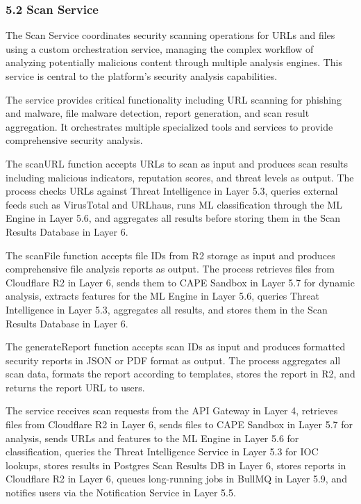 \documentclass[12pt,a4paper]{report}
\begin{document}
\subsubsection{5.2 Scan Service}

The Scan Service coordinates security scanning operations for URLs and files using a custom orchestration service, managing the complex workflow of analyzing potentially malicious content through multiple analysis engines. This service is central to the platform's security analysis capabilities.

The service provides critical functionality including URL scanning for phishing and malware, file malware detection, report generation, and scan result aggregation. It orchestrates multiple specialized tools and services to provide comprehensive security analysis.

The scanURL function accepts URLs to scan as input and produces scan results including malicious indicators, reputation scores, and threat levels as output. The process checks URLs against Threat Intelligence in Layer 5.3, queries external feeds such as VirusTotal and URLhaus, runs ML classification through the ML Engine in Layer 5.6, and aggregates all results before storing them in the Scan Results Database in Layer 6.

The scanFile function accepts file IDs from R2 storage as input and produces comprehensive file analysis reports as output. The process retrieves files from Cloudflare R2 in Layer 6, sends them to CAPE Sandbox in Layer 5.7 for dynamic analysis, extracts features for the ML Engine in Layer 5.6, queries Threat Intelligence in Layer 5.3, aggregates all results, and stores them in the Scan Results Database in Layer 6.

The generateReport function accepts scan IDs as input and produces formatted security reports in JSON or PDF format as output. The process aggregates all scan data, formats the report according to templates, stores the report in R2, and returns the report URL to users.

The service receives scan requests from the API Gateway in Layer 4, retrieves files from Cloudflare R2 in Layer 6, sends files to CAPE Sandbox in Layer 5.7 for analysis, sends URLs and features to the ML Engine in Layer 5.6 for classification, queries the Threat Intelligence Service in Layer 5.3 for IOC lookups, stores results in Postgres Scan Results DB in Layer 6, stores reports in Cloudflare R2 in Layer 6, queues long-running jobs in BullMQ in Layer 5.9, and notifies users via the Notification Service in Layer 5.5.
\end{document}
